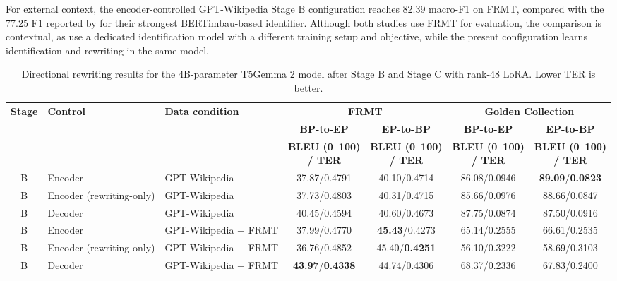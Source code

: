 \documentclass[acmtog,nonacm]{acmart}
\begin{document}
For external context, the encoder-controlled GPT-Wikipedia Stage B
configuration reaches 82.39 macro-F1 on FRMT, compared with the 77.25 F1
reported by \citet{Sousa_Almeida_Silvano_Cantante_Campos_Jorge_2025} for their
strongest BERTimbau-based identifier. Although both studies use FRMT for
evaluation, the comparison is contextual, as \citet{Sousa_Almeida_Silvano_Cantante_Campos_Jorge_2025} use a dedicated
identification model with a different training setup and objective, while the
present configuration learns identification and rewriting in the same model.

\begin{table}[tbp]
\centering
\small
\renewcommand{\arraystretch}{1.12}
\setlength{\tabcolsep}{3pt}
\caption{Directional rewriting results for the 4B-parameter T5Gemma 2 model after Stage B and Stage C with rank-48 LoRA. Lower TER is better.}
\label{tab:r48-translation-breakdown}
\begin{tabular}{@{}clp{4.4cm}cccc@{}}
\toprule
\textbf{Stage} & \textbf{Control} & \textbf{Data condition} &
\multicolumn{2}{c}{\textbf{FRMT}} &
\multicolumn{2}{c}{\textbf{Golden Collection}} \\
\cmidrule(lr){4-5} \cmidrule(lr){6-7}
& & & \textbf{BP-to-EP} & \textbf{EP-to-BP} & \textbf{BP-to-EP} & \textbf{EP-to-BP} \\
& & & \shortstack{\textbf{BLEU (0--100)}\\\textbf{/ TER}} & \shortstack{\textbf{BLEU (0--100)}\\\textbf{/ TER}} & \shortstack{\textbf{BLEU (0--100)}\\\textbf{/ TER}} & \shortstack{\textbf{BLEU (0--100)}\\\textbf{/ TER}} \\
\midrule
B & Encoder & GPT-Wikipedia & 37.87/0.4791 & 40.10/0.4714 & 86.08/0.0946 & \textbf{89.09}/\textbf{0.0823} \\
B & Encoder (rewriting-only) & GPT-Wikipedia & 37.73/0.4803 & 40.31/0.4715 & 85.66/0.0976 & 88.66/0.0847 \\
B & Decoder & GPT-Wikipedia & 40.45/0.4594 & 40.60/0.4673 & 87.75/0.0874 & 87.50/0.0916 \\
B & Encoder & GPT-Wikipedia + FRMT & 37.99/0.4770 & \textbf{45.43}/0.4273 & 65.14/0.2555 & 66.61/0.2535 \\
B & Encoder (rewriting-only) & GPT-Wikipedia + FRMT & 36.76/0.4852 & 45.40/\textbf{0.4251} & 56.10/0.3222 & 58.69/0.3103 \\
B & Decoder & GPT-Wikipedia + FRMT & \textbf{43.97}/\textbf{0.4338} & 44.74/0.4306 & 68.37/0.2336 & 67.83/0.2400 \\

\end{tabular}
\end{table}
\end{document}
